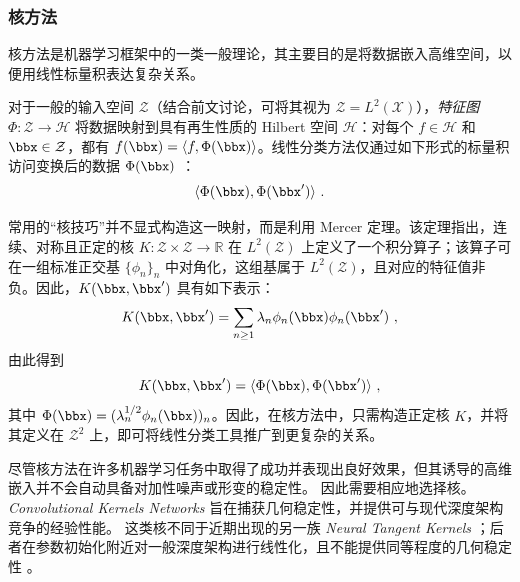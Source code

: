 \subsubsection{核方法}
\label{kernelmethods}

核方法是机器学习框架中的一类一般理论，其主要目的是将数据嵌入高维空间，以便用线性标量积表达复杂关系。

对于一般的输入空间 $\mathcal{Z}$（结合前文讨论，可将其视为 $\mathcal{Z} = L^2(\mathcal{X})$），\emph{特征图} $\Phi: \mathcal{Z} \longrightarrow \mathcal{H}$ 将数据映射到具有再生性质的 Hilbert 空间 $\mathcal{H}$：对每个 $f \in \mathcal{H}$ 和 $\bbx \in \mathcal{Z}$，都有 $f(\bbx) = \langle f, \Phi(\bbx) \rangle$。线性分类方法仅通过如下形式的标量积访问变换后的数据 $\Phi(\bbx)$ \cite{kernel_methods}：
$$\langle \Phi(\bbx), \Phi(\bbx') \rangle~.$$

常用的“核技巧”并不显式构造这一映射，而是利用 Mercer 定理。该定理指出，连续、对称且正定的核 $K: \mathcal{Z} \times \mathcal{Z} \to \mathbb{R}$ 在 $L^2(\mathcal{Z})$ 上定义了一个积分算子；该算子可在一组标准正交基 \cite{mercer_theorem} $\{\phi_n\}_n$ 中对角化，这组基属于 $L^2(\mathcal{Z})$，且对应的特征值非负。因此，$K(\bbx,\bbx')$ 具有如下表示：
$$K(\bbx,\bbx') = \sum_{n\geq 1} \lambda_n \phi_n(\bbx)\phi_n(\bbx')~,$$
由此得到
$$K(\bbx,\bbx') = \langle \Phi(\bbx), \Phi(\bbx') \rangle~,$$
其中 $\Phi(\bbx)=(\lambda_n^{1/2} \phi_n(\bbx)  )_n$。因此，在核方法中，只需构造正定核 $K$，并将其定义在 $\mathcal{Z}^2$ 上，即可将线性分类工具推广到更复杂的关系。

尽管核方法在许多机器学习任务中取得了成功并表现出良好效果，但其诱导的高维嵌入并不会自动具备对加性噪声或形变的稳定性。
因此需要相应地选择核。
\emph{Convolutional Kernels Networks} \cite{mairal2014convolutional,bietti2017group} 
旨在捕获几何稳定性，并提供可与现代深度架构竞争的经验性能。
这类核不同于近期出现的另一族 \emph{Neural Tangent Kernels} \cite{jacot2018neural}；后者在参数初始化附近对一般深度架构进行线性化，且不能提供同等程度的几何稳定性 \cite{bietti2019inductive}。

